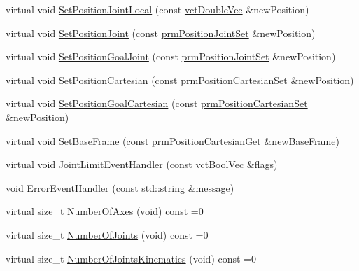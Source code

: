 \begin{DoxyCompactItemize}
\item 
virtual void \hyperlink{classmts_intuitive_research_kit_arm_a5064bc188dcba4345248689f0770b479}{Set\-Position\-Joint\-Local} (const \hyperlink{vct_dynamic_vector_types_8h_ade4b3068c86fb88f41af2e5187e491c2}{vct\-Double\-Vec} \&new\-Position)
\item 
virtual void \hyperlink{classmts_intuitive_research_kit_arm_aa79244fc49963ac5a86e33515d6f7a28}{Set\-Position\-Joint} (const \hyperlink{classprm_position_joint_set}{prm\-Position\-Joint\-Set} \&new\-Position)
\item 
virtual void \hyperlink{classmts_intuitive_research_kit_arm_ac15b7d7a8f9158e1375313dc7a816870}{Set\-Position\-Goal\-Joint} (const \hyperlink{classprm_position_joint_set}{prm\-Position\-Joint\-Set} \&new\-Position)
\item 
virtual void \hyperlink{classmts_intuitive_research_kit_arm_aa9bc859d4db6717fc7de986c62cb59d4}{Set\-Position\-Cartesian} (const \hyperlink{classprm_position_cartesian_set}{prm\-Position\-Cartesian\-Set} \&new\-Position)
\item 
virtual void \hyperlink{classmts_intuitive_research_kit_arm_af14cd392084eb47326b0a3afee59ee9a}{Set\-Position\-Goal\-Cartesian} (const \hyperlink{classprm_position_cartesian_set}{prm\-Position\-Cartesian\-Set} \&new\-Position)
\item 
virtual void \hyperlink{classmts_intuitive_research_kit_arm_a3632733fac5907809193dce7da023721}{Set\-Base\-Frame} (const \hyperlink{classprm_position_cartesian_get}{prm\-Position\-Cartesian\-Get} \&new\-Base\-Frame)
\item 
virtual void \hyperlink{classmts_intuitive_research_kit_arm_aa74276da0994e85622a1657c30070603}{Joint\-Limit\-Event\-Handler} (const \hyperlink{vct_dynamic_vector_types_8h_aeb2237c134aee3769198bd9d55c8a9e0}{vct\-Bool\-Vec} \&flags)
\item 
void \hyperlink{classmts_intuitive_research_kit_arm_acefc5b05c613ba6fdc8fea33380697af}{Error\-Event\-Handler} (const std\-::string \&message)
\item 
virtual size\-\_\-t \hyperlink{classmts_intuitive_research_kit_arm_ac4e94a3b87e5995946667faeaac171df}{Number\-Of\-Axes} (void) const =0
\item 
virtual size\-\_\-t \hyperlink{classmts_intuitive_research_kit_arm_a28cd357b9b185b2611348f770e9226c1}{Number\-Of\-Joints} (void) const =0
\item 
virtual size\-\_\-t \hyperlink{classmts_intuitive_research_kit_arm_a75b68e6123c544b92fffaf4f130fc72b}{Number\-Of\-Joints\-Kinematics} (void) const =0

\end{DoxyCompactItemize}
